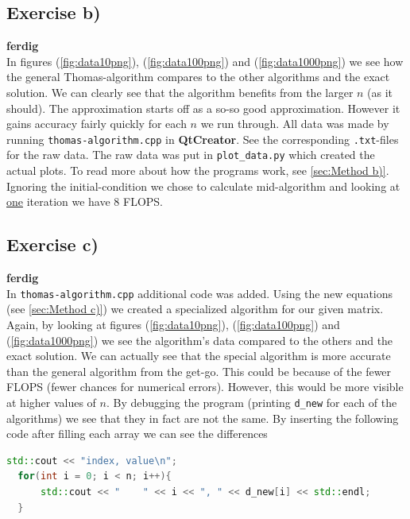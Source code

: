 \documentclass{article}
\begin{document}
  \subsection{Exercise b)} \label{sec:Results b)}

    {\bf ferdig} \\

    In figures (\ref{fig:data10png}), (\ref{fig:data100png}) and (\ref{fig:data1000png}) we see how the general Thomas-algorithm compares to the other algorithms and the exact solution. We can clearly see that the algorithm benefits from the larger $n$ (as it should). The approximation starts off as a so-so good approximation. However it gains accuracy fairly quickly for each $n$ we run through. All data was made by running \texttt{thomas-algorithm.cpp} in \textbf{QtCreator}. See the corresponding \texttt{.txt}-files for the raw data. The raw data was put in \texttt{plot\_data.py} which created the actual plots. To read more about how the programs work, see
    \ref{sec:Method b)}.\\

    Ignoring the initial-condition we chose to calculate mid-algorithm and looking at \underline{one} iteration we have 8 FLOPS.

  \subsection{Exercise c)} \label{sec:Results c)}

    {\bf ferdig} \\

    In \texttt{thomas-algorithm.cpp} additional code was added. Using the new equations (see \ref{sec:Method c)}) we created a specialized algorithm for our given matrix. Again, by looking at figures (\ref{fig:data10png}), (\ref{fig:data100png}) and (\ref{fig:data1000png}) we see the algorithm's data compared to the others and the exact solution. We can actually see that the special algorithm is more accurate than the general algorithm from the get-go. This could be because of the fewer FLOPS (fewer chances for numerical errors). However, this would be more visible at higher values of $n$. By debugging the program (printing \texttt{d\_new} for each of the algorithms) we see that they in fact are not the same. By inserting the following code after filling each array we can see the differences \\

  \begin{lstlisting}[language=C++]
    std::cout << "index, value\n";
  for(int i = 0; i < n; i++){
      std::cout << "    " << i << ", " << d_new[i] << std::endl;
  }
  \end{lstlisting}
\end{document}
